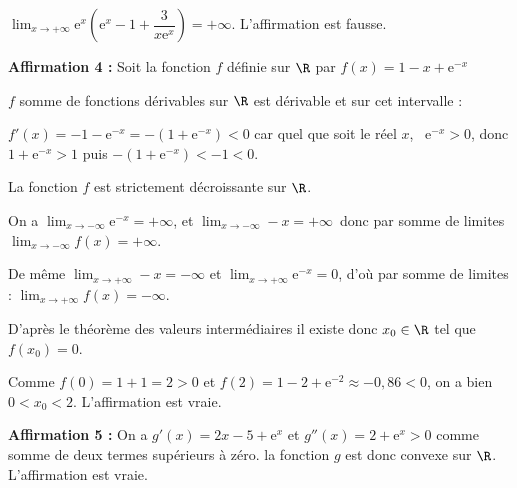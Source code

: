 $\displaystyle\lim_{x \to + \infty}\text{e}^{x}\left(\text{e}^{x} - 1 + \dfrac{3}{x\text{e}^{x}}\right) = + \infty$. L'affirmation est fausse.

\smallskip

\textbf{Affirmation 4 :} %
Soit la fonction $f$ définie sur $\R$ par $f(x) = 1 - x + \text{e}^{-x}$

$f$ somme de fonctions dérivables sur $\R$ est dérivable et sur cet intervalle :

$f'(x) = - 1 - \text{e}^{-x} = - \left(1 + \text{e}^{-x} \right) < 0$ car quel que soit le réel $x$, \, $\text{e}^{-x}  > 0$, donc $1 + \text{e}^{-x} > 1$ puis $- \left(1 + \text{e}^{-x} \right) < - 1 < 0$.

La fonction $f$ est strictement décroissante sur $\R$.


On a $\displaystyle\lim_{x \to - \infty} \text{e}^{-x} = + \infty$, et $\displaystyle\lim_{x \to - \infty} - x = + \infty$\, donc par somme de limites  $\displaystyle\lim_{x \to - \infty} f(x) = + \infty$.

De même $\displaystyle\lim_{x \to + \infty} - x = - \infty$ et $\displaystyle\lim_{x \to + \infty} \text{e}^{- x} = 0$, d'où par somme de limites : $\displaystyle\lim_{x \to + \infty} f(x) = - \infty$.

D'après le théorème des valeurs intermédiaires il existe donc $x_0 \in \R$ tel que $f\left(x_0\right) = 0$.

Comme $f(0) = 1 + 1 = 2 > 0$ et $f(2) = 1 - 2 + \text{e}^{-2} \approx - 0,86 < 0$, on a bien $0 < x_0 < 2$. L'affirmation est vraie.
\smallskip

\textbf{Affirmation 5 :} %
On a $g'(x) = 2x - 5 + \text{e}^x$ et $g''(x) = 2 + \text{e}^x > 0$ comme somme de deux termes supérieurs à zéro. la fonction $g$ est donc convexe sur $\R$. L'affirmation est vraie.

\bigskip

